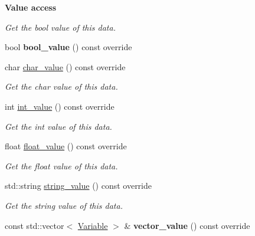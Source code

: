 \begin{Indent}{\bf Value access}\par
{\em Get the bool value of this data. }\begin{DoxyCompactItemize}
\item 
bool {\bfseries bool\+\_\+value} () const  override\hypertarget{classcreek_1_1_object_ac8f9daab3d62cde88123b91eb73470ea}{}\label{classcreek_1_1_object_ac8f9daab3d62cde88123b91eb73470ea}

\item 
char \hyperlink{classcreek_1_1_object_a4de59f8160388977173fdc4ed370a0dc}{char\+\_\+value} () const  override\hypertarget{classcreek_1_1_object_a4de59f8160388977173fdc4ed370a0dc}{}\label{classcreek_1_1_object_a4de59f8160388977173fdc4ed370a0dc}

\begin{DoxyCompactList}\small\item\em Get the char value of this data. \end{DoxyCompactList}\item 
int \hyperlink{classcreek_1_1_object_a1fd2af389138ed0fcbfad34fdf97cb2e}{int\+\_\+value} () const  override\hypertarget{classcreek_1_1_object_a1fd2af389138ed0fcbfad34fdf97cb2e}{}\label{classcreek_1_1_object_a1fd2af389138ed0fcbfad34fdf97cb2e}

\begin{DoxyCompactList}\small\item\em Get the int value of this data. \end{DoxyCompactList}\item 
float \hyperlink{classcreek_1_1_object_a570f526e3b603ba3d9a5432b4a2057f3}{float\+\_\+value} () const  override\hypertarget{classcreek_1_1_object_a570f526e3b603ba3d9a5432b4a2057f3}{}\label{classcreek_1_1_object_a570f526e3b603ba3d9a5432b4a2057f3}

\begin{DoxyCompactList}\small\item\em Get the float value of this data. \end{DoxyCompactList}\item 
std\+::string \hyperlink{classcreek_1_1_object_a7fcf4d8eac28006fbed894d6e71d59a4}{string\+\_\+value} () const  override\hypertarget{classcreek_1_1_object_a7fcf4d8eac28006fbed894d6e71d59a4}{}\label{classcreek_1_1_object_a7fcf4d8eac28006fbed894d6e71d59a4}

\begin{DoxyCompactList}\small\item\em Get the string value of this data. \end{DoxyCompactList}\item 
const std\+::vector$<$ \hyperlink{classcreek_1_1_variable}{Variable} $>$ \& {\bfseries vector\+\_\+value} () const  override\hypertarget{classcreek_1_1_object_a83833934ba7983e9218bd468d075538d}{}\label{classcreek_1_1_object_a83833934ba7983e9218bd468d075538d}

\end{DoxyCompactItemize}
\end{Indent}
